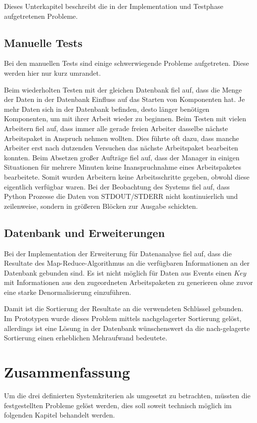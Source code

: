 Dieses Unterkapitel  beschreibt die in der Implementation und Testphase aufgetretenen Probleme.

\subsection{Manuelle Tests}

Bei den manuellen Tests sind einige schwerwiegende Probleme aufgetreten.
Diese werden hier nur kurz umrandet.

\begin{itemize}
        Beim wiederholten Testen mit der gleichen Datenbank fiel auf,
        dass die Menge der Daten in der Datenbank Einfluss auf das Starten von Komponenten hat.
        Je mehr Daten sich in der Datenbank befinden, desto länger benötigen Komponenten,
        um mit ihrer Arbeit wieder zu beginnen.
        Beim Testen mit vielen Arbeitern fiel auf, dass immer alle gerade freien Arbeiter
        dasselbe nächste Arbeitspaket in Anspruch nehmen wollten. Dies führte oft dazu,
        dass manche Arbeiter erst nach dutzenden Versuchen das nächste Arbeitspaket bearbeiten konnten.
        Beim Absetzen großer Aufträge fiel auf, dass der Manager in einigen Situationen
        für mehrere Minuten keine Inanspruchnahme eines Arbeitspaketes bearbeitete.
        Somit wurden Arbeitern keine Arbeitsschritte gegeben, obwohl diese eigentlich verfügbar waren.
        Bei der Beobachtung des Systems fiel auf, dass Python Prozesse
        die Daten von STDOUT/STDERR nicht kontinuierlich und zeilenweise,
        sondern in größeren Blöcken zur Ausgabe schickten.
\end{itemize}


\subsection{Datenbank und Erweiterungen}

Bei der Implementation der Erweiterung für Datenanalyse fiel auf,
dass die Resultate des Map-Reduce-Algorithmus an die verfügbaren Informationen an der Datenbank gebunden sind.
Es ist nicht möglich für Daten aus Events einen $Key$ mit Informationen aus den zugeordneten Arbeitspaketen zu generieren ohne zuvor eine starke Denormalisierung einzuführen.

Damit ist die Sortierung der Resultate an die verwendeten Schlüssel gebunden. 
Im Prototypen wurde dieses Problem mittels nachgelagerter Sortierung gelöst,
allerdings ist eine Lösung in der Datenbank wünschenswert da die nach-gelagerte Sortierung einen erheblichen Mehraufwand bedeutete.


\section{Zusammenfassung}
\label{sec:eval:zusammenfassung}
Um die drei definierten Systemkriterien als umgesetzt zu betrachten,
müssten die festgestellten Probleme gelöst werden,
dies soll soweit technisch möglich im folgenden Kapitel behandelt werden.

